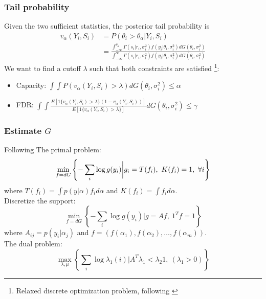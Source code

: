 \documentclass[10pt,mathserif,aspectratio=169]{beamer}
\begin{document}
\begin{frame}
  \frametitle{Tail probability}
  Given the two sufficient statistics, the posterior tail probability is
  \begin{align*}
    v_\alpha(Y_i,S_i) & = P( \theta_i > \theta_{\alpha} | Y_i,S_i)                                                                                 \\
                      & = \frac{{\int_{-\infty}^{\theta_{\alpha}} \Gamma(s_i|r_i,\sigma_i^2) f(y_i|\theta_i, \sigma_i^2) dG(\theta_i,\sigma_i^2)}}
    {{\int_{-\infty}^{\infty} \Gamma(s_i|r_i,\sigma_i^2) f(y_i|\theta_i, \sigma_i^2) dG(\theta_i,\sigma_i^2)}}
  \end{align*}
  We want to find a cutoff $\lambda$ such that both constraints are satisfied \footnote{Relaxed discrete optimization problem, following \cite{basu2018weighted}}:\\
  \begin{itemize}\itemsep=8pt
    \item Capacity: $\int \int P(v_\alpha(Y_i, S_i) > \lambda) dG(\theta_i,\sigma_i^2)
            \leq \alpha$
    \item FDR: $\int \int
            \frac{E[1\{v_\alpha(Y_i,S_i)>\lambda\}(1-v_\alpha(Y_i,S_i))]}{E[1\{v_\alpha(Y_i,S_i)>\lambda\}]}
            dG(\theta_i,\sigma_i^2) \leq \gamma$
  \end{itemize}
\end{frame}

\begin{frame}
  \frametitle{Estimate $G$}
  Following \cite{koenker2014convex}
  The primal problem:
  \begin{equation*}
    \min_{f=dG}\left\{-\sum_i \log g(y_i)\bigg |g_i = T(f_i),\ K(f_i)=1,\ \forall i \right\}
  \end{equation*}
  where $ T(f_i)=\int p(y |\alpha)f_id\alpha $ and  $K(f_i)= \int f_i d\alpha$.\\
  Discretize the support:
  \begin{equation*}
    \min_{f=dG}\left\{-\sum_i \log g(y_i)\bigg |g=Af,\ {1^T}f=1\right\}
  \end{equation*}
  where $A_{ij}= p(y_i|\alpha_j) $ and $ f = (f(\alpha_1),f(\alpha_2),\ldots,f(\alpha_m))$.\\
  The dual problem:
  \begin{equation*}
    \max_{\lambda,\mu} \left\{ \sum_i \log \lambda_1(i) \bigg| A^T\lambda_1 < \lambda_2 1,\ (\lambda_1>0) \right\}
  \end{equation*}
\end{frame}
\end{document}
